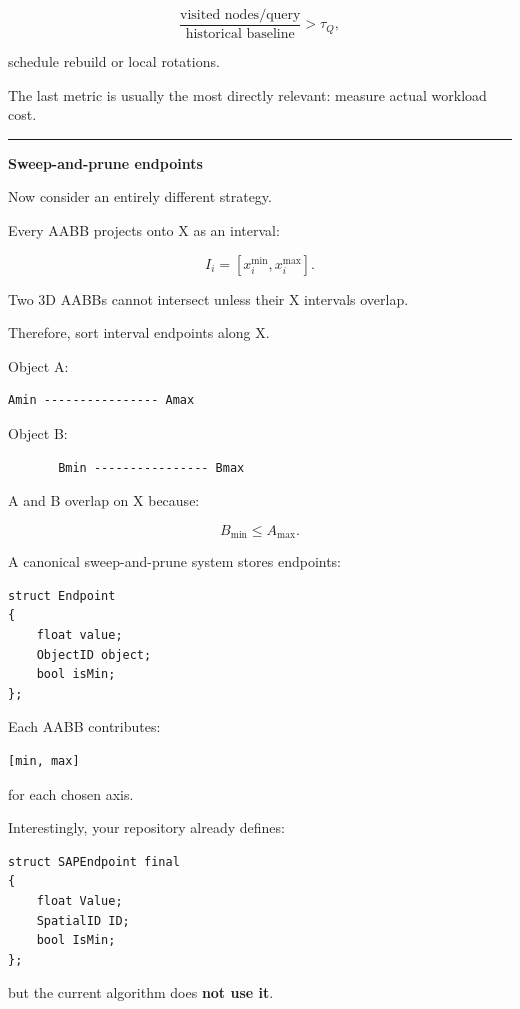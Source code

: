 \[
\frac{
\text{visited nodes/query}
}{
\text{historical baseline}
}>\tau_Q,
\]

schedule rebuild or local rotations.

The last metric is usually the most directly relevant: measure actual workload cost.

\begin{center}\rule{0.5\linewidth}{0.5pt}\end{center}

\textbf{Sweep-and-prune endpoints}

Now consider an entirely different strategy.

Every AABB projects onto X as an interval:

\[
I_i=[x_i^{\min},x_i^{\max}].
\]

Two 3D AABBs cannot intersect unless their X intervals overlap.

Therefore, sort interval endpoints along X.

Object A:

\begin{verbatim}
Amin ---------------- Amax
\end{verbatim}

Object B:

\begin{verbatim}
       Bmin ---------------- Bmax
\end{verbatim}

A and B overlap on X because:

\[
B_{\min}\le A_{\max}.
\]

A canonical sweep-and-prune system stores endpoints:

\begin{verbatim}
struct Endpoint
{
    float value;
    ObjectID object;
    bool isMin;
};
\end{verbatim}

Each AABB contributes:

\begin{verbatim}
[min, max]
\end{verbatim}

for each chosen axis.

Interestingly, your repository already defines:

\begin{verbatim}
struct SAPEndpoint final
{
    float Value;
    SpatialID ID;
    bool IsMin;
};
\end{verbatim}

but the current algorithm does \textbf{not use it}.

